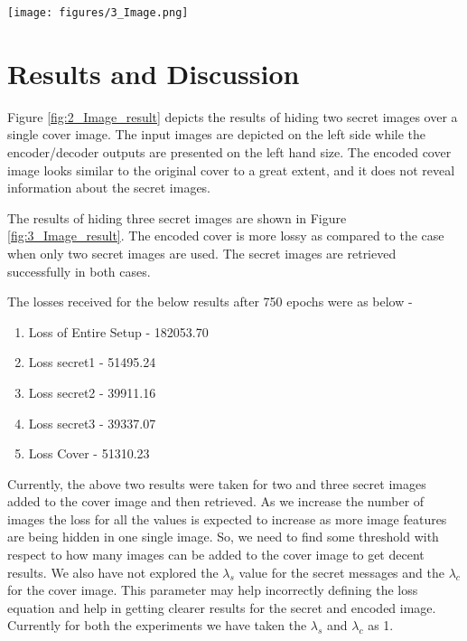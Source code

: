 \documentclass{article}
\begin{document}
\begin{figure*}[t]
\vskip 0.2in
\begin{center}
\centerline{\texttt{[image: figures/3\_Image.png]}}
\caption{Result of hiding three secret images. Left to Right Columns are: Cover Image, Secret Image1, Secret Image2, Secret Image2, Secret Image3,Encoded Cover Image, Decoded Secret Image1, Decoded Secret Image2, Decoded Secret Image3.}
\label{fig:3_Image_result}
\end{center}
\vskip -0.2in
\end{figure*}


\section{Results and Discussion}
Figure \ref{fig:2_Image_result} depicts the results of hiding two secret images over a single cover image. The input images are depicted on the left side while the encoder/decoder outputs are presented on the left hand size. The encoded cover image looks similar to the original cover to a great extent, and it does not reveal information about the secret images. 

The results of hiding three secret images are shown in Figure \ref{fig:3_Image_result}. The encoded cover is more lossy as compared to the case when only two secret images are used. The secret images are retrieved successfully in both cases. 


The losses received for the below results after 750 epochs were as below - 
\begin{enumerate}
\itemsep0em 
\item Loss of Entire Setup - 182053.70
\item Loss secret1 - 51495.24
\item Loss secret2 - 39911.16
\item Loss secret3 - 39337.07
\item Loss Cover - 51310.23
\end{enumerate}

Currently, the above two results were taken for two and three secret images added to the cover image and then retrieved. As we increase the number of images the loss for all the values is expected to increase as more image features are being hidden in one single image. So, we need to find some threshold with respect to how many images can be added to the cover image to get decent results. We also have not explored the $\lambda_s$ value for the secret messages and the $\lambda_c$ for the cover image. This parameter may help incorrectly defining the loss equation and help in getting clearer results for the secret and encoded image. Currently for both the experiments we have taken the $\lambda_s$ and $\lambda_c$ as 1.
\end{document}
